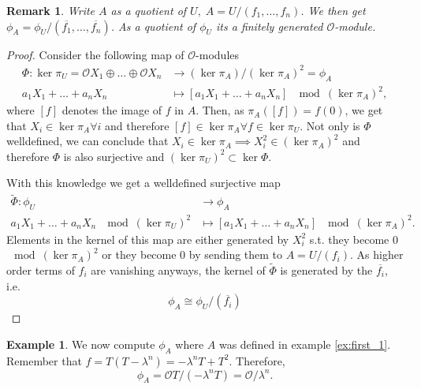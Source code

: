 \documentclass{article}
\theoremstyle{plain}%
\newtheorem{remark}{Remark}[section]
\theoremstyle{definition}
\newtheorem{example}{Example}[section]
\theoremstyle{remark}
\begin{document}
    \begin{remark}
        Write \(A\) as a quotient of \(U,\; A = U/(f_1, \dots, f_n)\).
        We then get \(\phi_A = \phi_U/(\overline{f_1}, \dots, \overline{f_n})\).
        As a quotient of \(\phi_U\) its a finitely generated \(\mathcal{O}\)-module.
    \end{remark}
    \begin{proof}
        Consider the following map of \(\mathcal{O}\)-modules
        \begin{align*}
            \Phi\colon \ker \pi_U = \mathcal{O}X_1 \oplus \dots \oplus \mathcal{O}X_n &\to (\ker \pi_A)/(\ker \pi_A)^2 = \phi_A\\
            a_1X_1 + \dots + a_nX_n &\mapsto [a_1X_1 + \dots + a_nX_n] \; \mod (\ker \pi_A)^2,
        \end{align*}
        where \([f]\) denotes the image of \(f\) in \(A\).
        Then, as \(\pi_A([f]) = f(0)\), we get that \(X_i \in \ker \pi_A \forall i\)
        and therefore \([f] \in \ker \pi_A \forall f \in \ker \pi_U\). Not only is \(\Phi\) welldefined,
        we can conclude that \(X_i \in \ker \pi_A \implies X_i^2 \in (\ker \pi_A)^2\)
        and therefore \(\Phi\) is also surjective and \((\ker \pi_U)^2 \subset \ker \Phi\).
        
        With this knowledge we get a welldefined surjective map
        \begin{align*}
            \tilde \Phi\colon \phi_U &\to \phi_A\\
            a_1X_1 + \dots + a_nX_n \; \mod (\ker \pi_U)^2 &\mapsto [a_1X_1 + \dots + a_nX_n] \; \mod (\ker \pi_A)^2.
        \end{align*}
        Elements in the kernel of this map are either generated by \(X_i^2\) s.t. they become 0 \(\mod (\ker \pi_A)^2\)
        or they become 0 by sending them to \(A = U/(f_i)\).
        As higher order terms of \(f_i\) are vanishing anyways, 
        the kernel of \(\tilde \Phi\) is generated by the \(\overline{f_i}\), i.e.
        \[
            \phi_A \cong \phi_U/(\overline{f_i})  
        \]
    \end{proof}

    \begin{example}\label{ex:first_phi}
        We now compute \(\phi_A\) where \(A\) was defined in example \ref{ex:first_1}.
        Remember that \(f = T(T-\lambda^n) = -\lambda^n T + T^2\). Therefore,
        \[\phi_A = \mathcal{O}T/(-\lambda^n T) = \mathcal{O}/\lambda^n.\]
    \end{example}
\end{document}
